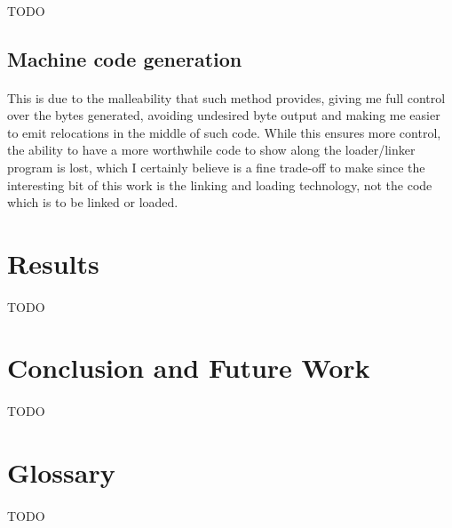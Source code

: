 \documentclass[12pt]{article}
\begin{document}
	\paragraph{} TODO
	
	\subsection{Machine code generation}
	
	\paragraph{}This is due to the malleability that such method provides, giving me full control over the bytes generated, avoiding undesired byte output and making me easier to emit relocations in the middle of such code. While this ensures more control, the ability to have a more worthwhile code to show along the loader/linker program is lost, which I certainly believe is a fine trade-off to make since the interesting bit of this work is the linking and loading technology, not the code which is to be linked or loaded.
	
	\section{Results}
	\paragraph{}TODO
	
	\section{Conclusion and Future Work}
	\paragraph{}TODO
	
	\section{Glossary}
	\paragraph{}TODO
\end{document}
